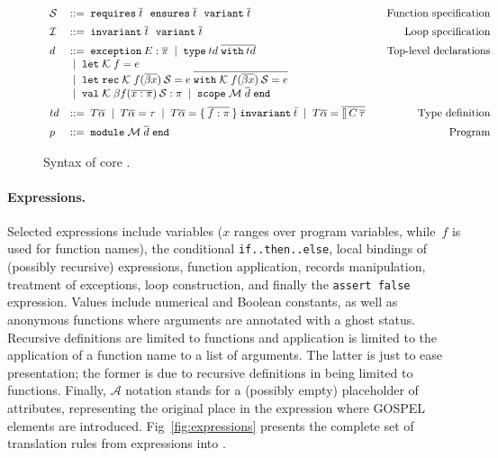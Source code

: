 \documentclass{easychair}
\newcommand{\GOSPEL}{{\textsf{GOSPEL}}\xspace}
\newcommand{\spec}{\mathcal{S}}
\newcommand{\loops}{\mathcal{I}}
\newcommand{\atts}{\mathcal{A}}
\newcommand{\kind}{\mathcal{K}}
\begin{document}
\begin{figure}[h!]
\[\begin{array}{llr}
    \spec & ::= \; \texttt{requires}\; \overline{t}~~
             \texttt{ensures}\; \overline{t}~~
            \texttt{variant}\; \overline{t}
    & \alabel{Function specification} \\[.5em]

    \loops & ::= \; \texttt{invariant}\; \overline{t}~~\texttt{variant}\;
             \overline{t} & \alabel{Loop specification} \\[.5em]

    d & ::= \; \texttt{exception}\: E : \pibar
        \sep \texttt{type}\: td \; \overline{\texttt{with}\:td}~~~~~
                                  & \alabel{Top-level declarations} \\
      & \sep \mathtt{let} \; \mathcal{K} \; f = e \\
      & \sep \mathtt{let} \; \texttt{rec} \; \mathcal{K} \; f(\overline{\beta x})
        \:\spec = e \;
        \overline{\mathtt{with}\;\kind\;f (\overline{\beta x})\:\spec = e}\\
      & \sep \mathtt{val}\;\mathcal{K}\;\beta f(\overline{x:\pi})\:\spec : \pi
        \sep \texttt{scope} \;\mathcal{M}\;\overline{d} \; \texttt{end} \\[.5em]

    td & ::= \; T\alphabar
         \sep T\alphabar = \tau
         \sep
         T\alphabar = \{\: \overline{f : \pi}\:\}\:\texttt{invariant}\:\bar{t}
         \sep T\alphabar = \overline{\talloblong\,C\,\overline{\tau}}
    & \alabel{Type definition}\\[.5em]

    p & ::= \; \texttt{module}\;\mathcal{M}\;\overline{d}\;\texttt{end}
    & \alabel{Program}
  \end{array}
\]
\caption{Syntax of core \whyml.}
\label{fig:whyml}
\end{figure}

\paragraph{Expressions.} Selected \ocaml expressions include variables ($x$
ranges over program variables, while~$f$ is used for function names), the
conditional \texttt{if..then..else}, local bindings of (possibly recursive)
expressions, function application, records manipulation, treatment of
exceptions, loop construction, and finally the \texttt{assert false}
expression. Values include numerical and Boolean constants, as well as anonymous
functions where arguments are annotated with a ghost status. Recursive
definitions are limited to functions and application is limited to the
application of a function name to a list of arguments. The latter is just to
ease presentation; the former is due to recursive definitions in \whyml being
limited to functions. Finally, $\atts$ notation stands for a (possibly empty)
placeholder of \ocaml attributes, representing the original place in the
expression where \GOSPEL elements are introduced. Fig~\ref{fig:expressions}
presents the complete set of translation rules from \ocaml expressions into
\whyml.
\end{document}
